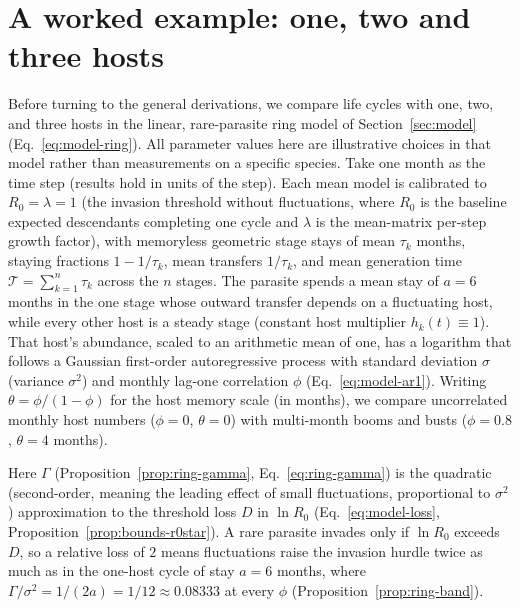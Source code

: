 \FloatBarrier
\section{A worked example: one, two and three hosts}\label{sec:example}

Before turning to the general derivations, we compare life cycles with one, two, and three hosts in the linear, rare-parasite ring model of Section~\ref{sec:model} (Eq.~\eqref{eq:model-ring}). All parameter values here are illustrative choices in that model rather than measurements on a specific species. Take one month as the time step (results hold in units of the step). Each mean model is calibrated to $R_0 = \lambda = 1$ (the invasion threshold without fluctuations, where $R_0$ is the baseline expected descendants completing one cycle and $\lambda$ is the mean-matrix per-step growth factor), with memoryless geometric stage stays of mean $\tau_k$ months, staying fractions $1 - 1/\tau_k$, mean transfers $1/\tau_k$, and mean generation time $\mathcal{T} = \sum_{k=1}^n \tau_k$ across the $n$ stages. The parasite spends a mean stay of $a = 6$ months in the one stage whose outward transfer depends on a fluctuating host, while every other host is a steady stage (constant host multiplier $h_k(t) \equiv 1$). That host's abundance, scaled to an arithmetic mean of one, has a logarithm that follows a Gaussian first-order autoregressive process with standard deviation $\sigma$ (variance $\sigma^2$) and monthly lag-one correlation $\phi$ (Eq.~\eqref{eq:model-ar1}). Writing $\theta = \phi/(1 - \phi)$ for the host memory scale (in months), we compare uncorrelated monthly host numbers ($\phi = 0$, $\theta = 0$) with multi-month booms and busts ($\phi = 0.8$, $\theta = 4$ months).

Here $\Gamma$ (Proposition~\ref{prop:ring-gamma}, Eq.~\eqref{eq:ring-gamma}) is the quadratic (second-order, meaning the leading effect of small fluctuations, proportional to $\sigma^2$) approximation to the threshold loss $D$ in $\ln R_0$ (Eq.~\eqref{eq:model-loss}, Proposition~\ref{prop:bounds-r0star}). A rare parasite invades only if $\ln R_0$ exceeds $D$, so a relative loss of $2$ means fluctuations raise the invasion hurdle twice as much as in the one-host cycle of stay $a = 6$ months, where $\Gamma/\sigma^2 = 1/(2a) = 1/12 \approx 0.08333$ at every $\phi$ (Proposition~\ref{prop:ring-band}).

